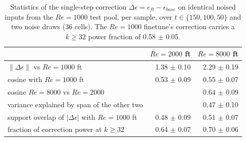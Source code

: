 \begin{table}[t]
  \centering
  \caption{Statistics of the single-step correction $\Delta\epsilon=\epsilon_{ft}-\epsilon_{base}$ on identical noised inputs from the $Re{=}1000$ test pool, per sample, over $t\in\{150,100,50\}$ and two noise draws ($36$ cells). The $Re{=}1000$ finetune's correction carries a $k\geq32$ power fraction of 0.58 $\pm$ 0.05.}
  \label{tab:eps-correction-stats}
  \begin{tabular}{lrr}
    \toprule
    & $Re{=}2000$ ft & $Re{=}8000$ ft \\
    \midrule
    $\|\Delta\epsilon\|$ vs $Re{=}1000$ ft & 1.38 $\pm$ 0.10 & 2.29 $\pm$ 0.19 \\
    cosine with $Re{=}1000$ ft & 0.53 $\pm$ 0.09 & 0.55 $\pm$ 0.07 \\
    cosine $Re{=}8000$ vs $Re{=}2000$ &  & 0.64 $\pm$ 0.09 \\
    variance explained by span of the other two &  & 0.47 $\pm$ 0.10 \\
    support overlap of $|\Delta\epsilon|$ with $Re{=}1000$ ft & 0.48 $\pm$ 0.09 & 0.51 $\pm$ 0.07 \\
    fraction of correction power at $k\geq32$ & 0.64 $\pm$ 0.07 & 0.70 $\pm$ 0.06 \\
    \bottomrule
  \end{tabular}
\end{table}

